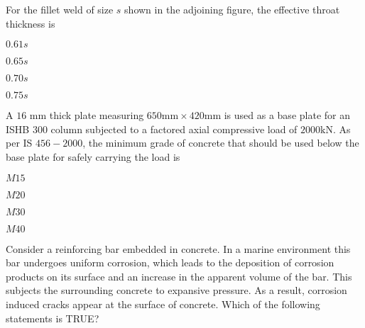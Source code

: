 \item For the fillet weld of size $s$ shown in the adjoining figure, the effective throat thickness is \\
\begin{enumerate}
\begin{multicols}{2}
\item $0.61s$ 
\item $0.65s$
\item $0.70s$
\item $0.75s$
\end{multicols}
\end{enumerate}
\item A $16$ mm thick plate measuring $650 \text{mm} \times 420 \text{mm} $ is used as a base plate for an ISHB $300$ column subjected to a factored axial compressive load of $2000  \text{kN}$. As per IS $456-2000$, the minimum grade of concrete that should be used below the base plate for safely carrying the load is
\begin{enumerate}
\begin{multicols}{2}
\item $ M15 $
\item $ M20 $
\item $ M30 $
\item $ M40 $
\end{multicols}
\end{enumerate}
\item Consider a reinforcing bar embedded in concrete. In a marine environment this bar undergoes uniform corrosion, which leads to the deposition of corrosion products on its surface and an increase in the apparent volume of the bar. This subjects the surrounding concrete to expansive pressure. As a result, corrosion induced cracks appear at the surface of concrete. Which of the following statements is TRUE?
